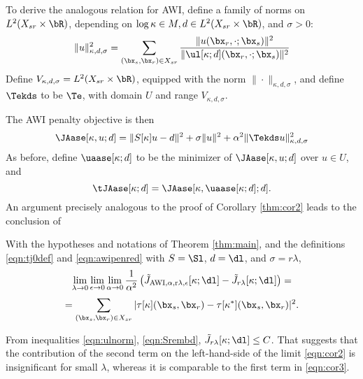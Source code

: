 To derive the analogous relation for AWI, define a family of norms on
$ L^2(X_{sr} \times \bR)$, depending on $\log \kappa \in M, d \in
L^2(X_{sr} \times \bR)$, and $\sigma >0$:
\begin{equation}
  \label{eqn:awinormdef}
  \|u\|^2_{\kappa,d,\sigma} = \sum_{(\bx_s,\bx_r) \in X_{sr}}\frac{\|u(\bx_r,\cdot;\bx_s)\|^2}{\|\ul[\kappa;d](\bx_r,\cdot;\bx_s)\|^2}
\end{equation}
Define $V_{\kappa,d,\sigma} = L^2(X_{sr} \times \bR)$, equipped with
the norm $\|\cdot\|_{\kappa,d,\sigma}$, and define $\Tekds$ to be
$\Te$, with domain $U$ and range $V_{\kappa,d,\sigma}$.

The AWI penalty objective is then
\begin{equation}
  \label{eqn:awipen}
  \JAase[\kappa,u;d] = \|S[\kappa]u-d\|^2 + \sigma\|u\|^2 + \alpha^2
  \|\Tekds u\|_{\kappa,d,\sigma}^2
\end{equation}
As before, define $\uaase[\kappa;d]$ to be the minimizer of
$\JAase[\kappa,u;d]$ over $u \in U$, and
\begin{equation}
  \label{eqn:awipenred}
  \tJAase[\kappa;d] =\JAase[\kappa,\uaase[\kappa;d];d].
\end{equation}
An argument precisely analogous to the proof of Corollary
\ref{thm:cor2} leads to the conclusion of
\begin{cor}
  \label{thm:cor3}
  With the hypotheses and notations of Theorem \ref{thm:main}, and the
  definitions \ref{eqn:tj0def} and \ref{eqn:awipenred} with $S=\Sl$,
  $d=\dl$, and $\sigma=r\lambda$,
  \[
  \lim_{\lambda \rightarrow 0}\lim_{\epsilon \rightarrow 0}\lim_{\alpha \rightarrow 0}
  \frac{1}{\alpha^2}\left(\tilde{J}_{\rm AWI,\alpha,r\lambda,\epsilon}[\kappa;\dl]-\tilde{J}_{r\lambda}[\kappa;\dl]\right)=
  \]
  \begin{equation}
    \label{eqn:cor3}
    = \sum_{(\bx_s,\bx_r) \in X_{sr}} |\tau[\kappa](\bx_s,\bx_r) - \tau[\kappa^*](\bx_s,\bx_r)|^2.
  \end{equation}
\end{cor}

 From inequalities \ref{eqn:ulnorm},
\ref{eqn:Srembd}, $\tilde{J}_{r\lambda}[\kappa;\dl] \le C$. That
suggests that the contribution of the second term on the
left-hand-side of the limit \ref{eqn:cor2} is insignificant for small
$\lambda$, whereas it is comparable to the first term in
\ref{eqn:cor3}. 




